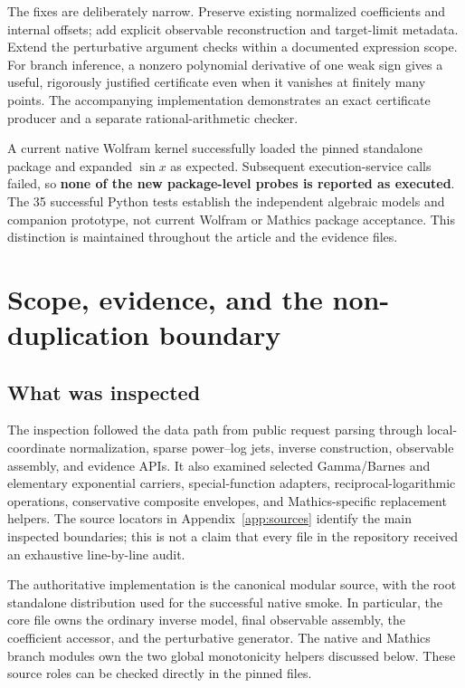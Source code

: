 \documentclass[11pt,letterpaper]{article}
\begin{document}
The fixes are deliberately narrow. Preserve existing normalized coefficients and internal offsets; add explicit observable reconstruction and target-limit metadata. Extend the perturbative argument checks within a documented expression scope. For branch inference, a nonzero polynomial derivative of one weak sign gives a useful, rigorously justified certificate even when it vanishes at finitely many points. The accompanying implementation demonstrates an exact certificate producer and a separate rational-arithmetic checker.

A current native Wolfram kernel successfully loaded the pinned standalone package and expanded \(\sin x\) as expected. Subsequent execution-service calls failed, so \textbf{none of the new package-level probes is reported as executed}. The 35 successful Python tests establish the independent algebraic models and companion prototype, not current Wolfram or Mathics package acceptance. This distinction is maintained throughout the article and the evidence files.

\clearpage
\begingroup
\setlength{\parskip}{0pt}
\small
\tableofcontents
\endgroup
\clearpage

\section{Scope, evidence, and the non-duplication boundary}
\label{sec:scope}

\subsection{What was inspected}
The inspection followed the data path from public request parsing through local-coordinate normalization, sparse power--log jets, inverse construction, observable assembly, and evidence APIs. It also examined selected Gamma/Barnes and elementary exponential carriers, special-function adapters, reciprocal-logarithmic operations, conservative composite envelopes, and Mathics-specific replacement helpers. The source locators in Appendix~\ref{app:sources} identify the main inspected boundaries; this is not a claim that every file in the repository received an exhaustive line-by-line audit.

The authoritative implementation is the canonical modular source, with the root standalone distribution used for the successful native smoke. In particular, the core file owns the ordinary inverse model, final observable assembly, the coefficient accessor, and the perturbative generator. The native and Mathics branch modules own the two global monotonicity helpers discussed below. These source roles can be checked directly in the pinned files.\cite{core,branches,mathicsbranches,mathicscalculus}
\end{document}
